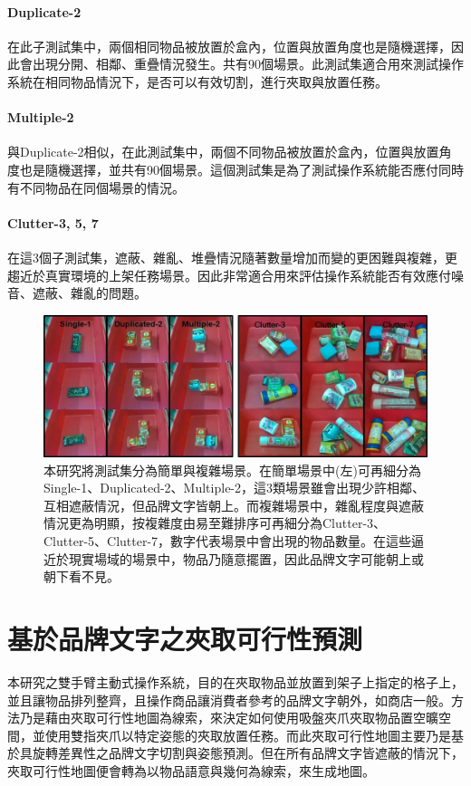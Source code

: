 \paragraph{Duplicate-2}
在此子測試集中，兩個相同物品被放置於盒內，位置與放置角度也是隨機選擇，因此會出現分開、相鄰、重疊情況發生。共有90個場景。此測試集適合用來測試操作系統在相同物品情況下，是否可以有效切割，進行夾取與放置任務。

\paragraph{Multiple-2}
與Duplicate-2相似，在此測試集中，兩個不同物品被放置於盒內，位置與放置角度也是隨機選擇，並共有90個場景。這個測試集是為了測試操作系統能否應付同時有不同物品在同個場景的情況。

\paragraph{Clutter-3, 5, 7}
在這3個子測試集，遮蔽、雜亂、堆疊情況隨著數量增加而變的更困難與複雜，更趨近於真實環境的上架任務場景。因此非常適合用來評估操作系統能否有效應付噪音、遮蔽、雜亂的問題。


\begin{figure}[H]
	\centering
	\includegraphics[height=!, width=1.0\linewidth, keepaspectratio=true]
	{./figures/testset.jpg}
  \caption{本研究將測試集分為簡單與複雜場景。在簡單場景中(左)可再細分為Single-1、Duplicated-2、Multiple-2，這3類場景雖會出現少許相鄰、互相遮蔽情況，但品牌文字皆朝上。而複雜場景中，雜亂程度與遮蔽情況更為明顯，按複雜度由易至難排序可再細分為Clutter-3、Clutter-5、Clutter-7，數字代表場景中會出現的物品數量。在這些逼近於現實場域的場景中，物品乃隨意擺置，因此品牌文字可能朝上或朝下看不見。}
  \label{figure:testset}
\end{figure}


\section{基於品牌文字之夾取可行性預測}\label{sec:affordance_pr}
本研究之雙手臂主動式操作系統，目的在夾取物品並放置到架子上指定的格子上，並且讓物品排列整齊，且操作商品讓消費者參考的品牌文字朝外，如商店一般。方法乃是藉由夾取可行性地圖為線索，來決定如何使用吸盤夾爪夾取物品置空曠空間，並使用雙指夾爪以特定姿態的夾取放置任務。而此夾取可行性地圖主要乃是基於具旋轉差異性之品牌文字切割與姿態預測。但在所有品牌文字皆遮蔽的情況下，夾取可行性地圖便會轉為以物品語意與幾何為線索，來生成地圖。

